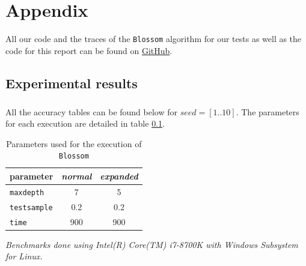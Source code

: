 \documentclass[12pt]{report}
\theoremstyle{definition}
\theoremstyle{definition}
\theoremstyle{definition}
\begin{document}
\appendix
\chapter*{Appendix}
\label{chap:appendix}
All our code and the traces of the \texttt{Blossom} algorithm for our tests as well as the code for this report can be found on \href{https://github.com/Selarow/blossom}{GitHub}.


\section*{Experimental results}
\paragraph{} All the accuracy tables can be found below for $seed=[1..10]$. The parameters for each execution are detailed in table \ref{fig:parameters}. \\

\begin{table}[ht]
    \centering
    \begin{tabular}{lcc}
    \hline
    \multicolumn{1}{l}{\bf parameter} & \multicolumn{1}{p{2cm}}{\centering \it normal} & \multicolumn{1}{p{2cm}}{\centering \it expanded} \\
    \hline
    \multicolumn{1}{l}{\tt maxdepth}   & \multicolumn{1}{c}{  7} & \multicolumn{1}{c}{5} \\
    \multicolumn{1}{l}{\tt testsample} & \multicolumn{1}{c}{0.2} & \multicolumn{1}{c}{0.2} \\
    \multicolumn{1}{l}{\tt time}       & \multicolumn{1}{c}{900} & \multicolumn{1}{c}{900} \\
    \hline
    \end{tabular}
    \caption{Parameters used for the execution of \texttt{Blossom}}
    \label{fig:parameters}
\end{table}

\it Benchmarks done using Intel(R) Core(TM) i7-8700K with Windows Subsystem for Linux.
\\\\\\\\\\\\
\end{document}
